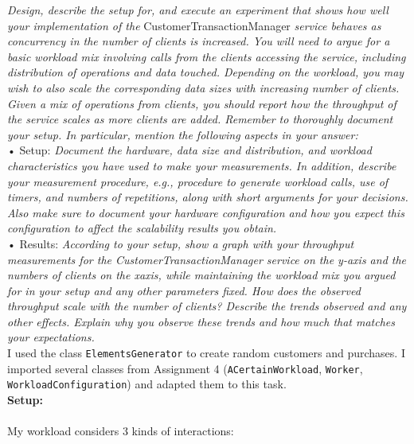 \documentclass[paper=a4, fontsize=11pt]{scrartcl} %
\numberwithin{equation}{section} %
\numberwithin{figure}{section} %
\numberwithin{table}{section} %
\begin{document}
\textit{Design, describe the setup for, and execute an experiment that shows how well your
implementation of the }CustomerTransactionManager\textit{ service behaves as concurrency in the
number of clients is increased. You will need to argue for a basic workload mix involving calls from the
clients accessing the service, including distribution of operations and data touched. Depending on the
workload, you may wish to also scale the corresponding data sizes with increasing number of clients.
Given a mix of operations from clients, you should report how the throughput of the service scales as
more clients are added. Remember to thoroughly document your setup. In particular, mention the
following aspects in your answer:}\\
• Setup: \textit{Document the hardware, data size and distribution, and workload characteristics you
have used to make your measurements. In addition, describe your measurement procedure, e.g.,
procedure to generate workload calls, use of timers, and numbers of repetitions, along with short
arguments for your decisions. Also make sure to document your hardware configuration and how
you expect this configuration to affect the scalability results you obtain.}\\
• Results:\textit{ According to your setup, show a graph with your throughput measurements for the
CustomerTransactionManager service on the y-axis and the numbers of clients on the xaxis,
while maintaining the workload mix you argued for in your setup and any other parameters
fixed. How does the observed throughput scale with the number of clients? Describe the trends
observed and any other effects. Explain why you observe these trends and how much that matches
your expectations.
}\\
I used the class \verb|ElementsGenerator| to create random customers and purchases. I imported several classes from Assignment 4 (\verb|ACertainWorkload|, \verb|Worker|, \verb|WorkloadConfiguration|) and adapted them to this task.\\
\textbf{Setup:}\\

~\\
My workload considers 3 kinds of interactions:
\end{document}
